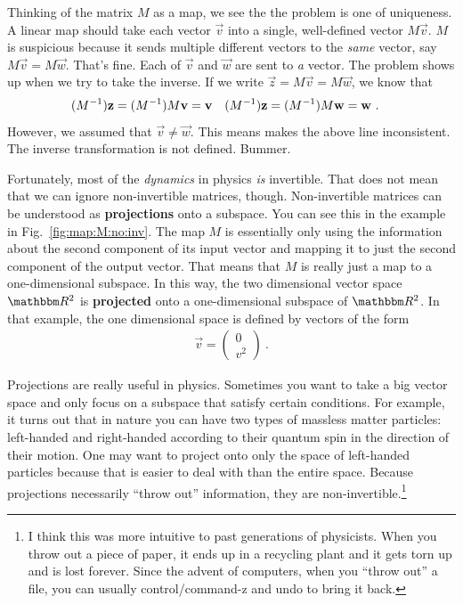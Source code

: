 \documentclass[12pt]{article}
\begin{document}
% 
Thinking of the matrix $M$ as a map, we see the the problem is one of uniqueness. A linear map should take each vector $\vec{v}$ into a single, well-defined vector $M\vec{v}$. $M$ is suspicious because it sends multiple different vectors to the \emph{same} vector, say $M\vec{v} = M\vec{w}$. That's fine. Each of $\vec{v}$ and $\vec{w}$ are sent to \emph{a} vector. The problem shows up when we try to take the inverse. If we write $\vec{z} = M\vec{v} = M\vec{w}$, we know that
\begin{align}
    (M^{-1})\mathbf{z} = (M^{-1})M\mathbf{v} &= \mathbf{v}
    &
    (M^{-1})\mathbf{z} = (M^{-1})M\mathbf{w} &= \mathbf{w} \ .
\end{align}
However, we assumed that $\vec{v} \neq \vec{w}$. This means makes the above line inconsistent. The inverse transformation is not defined. Bummer.

Fortunately, most of the \emph{dynamics} in physics \emph{is} invertible. That does not mean that we can ignore non-invertible matrices, though. Non-invertible matrices can be understood as \textbf{projections} onto a subspace. You can see this in the example in Fig.~\ref{fig:map:M:no:inv}. The map $M$ is essentially only using the information about the second component of its input vector and mapping it to just the second component of the output vector. That means that $M$ is really just a map to a one-dimensional subspace. In this way, the two dimensional vector space $\RR ^2$ is \textbf{projected} onto a one-dimensional subspace of $\RR ^2$. In that example, the one dimensional space is defined by vectors of the form
\begin{align}
    \vec{v} = 
    \begin{pmatrix}
    0\\ v^2    
    \end{pmatrix} \ .
\end{align}

Projections are really useful in physics. Sometimes you want to take a big vector space and only focus on a subspace that satisfy certain conditions. For example, it turns out that in nature you can have two types of massless matter particles: left-handed and right-handed according to their quantum spin in the direction of their motion. One may want to project onto only the space of left-handed particles because that is easier to deal with than the entire space. Because projections necessarily ``throw out'' information, they are non-invertible.\footnote{I think this was more intuitive to past generations of physicists. When you throw out a piece of paper, it ends up in a recycling plant and it gets torn up and is lost forever. Since the advent of computers, when you ``throw out'' a file, you can usually control/command-z and undo to bring it back.}
\end{document}
